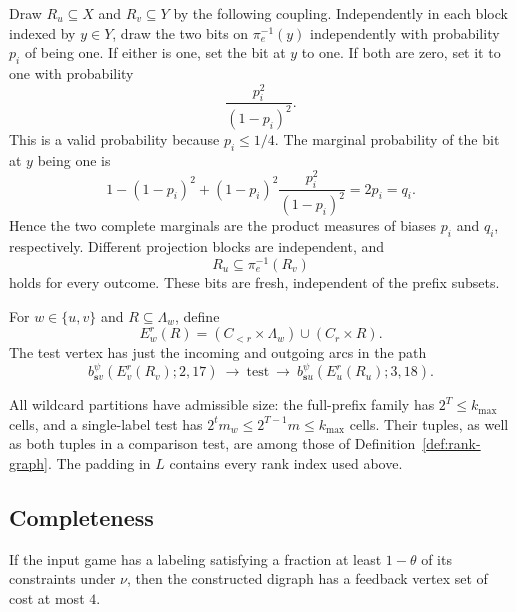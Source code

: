 \begin{definition}
\begin{enumerate}[label=\arabic*.,leftmargin=*]
  Draw $R_u\subseteq X$ and $R_v\subseteq Y$ by the following coupling.
  Independently in each block indexed by $y\in Y$, draw the two bits on
  $\pi_e^{-1}(y)$ independently with probability $p_i$ of being one.  If
  either is one, set the bit at $y$ to one.  If both are zero, set it to
  one with probability
  \begin{equation}
    \frac{p_i^2}{(1-p_i)^2}.
    \label{eq:coupling-residual}
  \end{equation}
  This is a valid probability because $p_i\le 1/4$.  The marginal
  probability of the bit at $y$ being one is
  \[
    1-(1-p_i)^2+(1-p_i)^2\frac{p_i^2}{(1-p_i)^2}
    =2p_i=q_i.
  \]
  Hence the two complete marginals are the product measures of biases
  $p_i$ and $q_i$, respectively.  Different projection blocks are
  independent, and
  \begin{equation}
    R_u\subseteq\pi_e^{-1}(R_v)
    \label{eq:coupling-inclusion}
  \end{equation}
  holds for every outcome.  These bits are fresh, independent of the
  prefix subsets.

  For $w\in\{u,v\}$ and $R\subseteq\Lambda_w$, define
  \begin{equation}
    E_w^r(R)=
      (C_{<r}\times\Lambda_w)\cup(C_r\times R).
    \label{eq:comparison-sets}
  \end{equation}
  The test vertex has just the incoming and outgoing arcs in the path
  \begin{equation}
    b_{\mathbf s v}^{\psi}(E_v^r(R_v);2,17)
    \ \longrightarrow\ \text{test}\ \longrightarrow\
    b_{\mathbf s u}^{\psi}(E_u^r(R_u);3,18).
    \label{eq:comparison-path}
  \end{equation}
\end{enumerate}
\end{definition}

All wildcard partitions have admissible size: the full-prefix family has
$2^T\le k_{\max}$ cells, and a single-label test has
$2^tm_w\le 2^{T-1}m\le k_{\max}$ cells.  Their tuples, as well as both
tuples in a comparison test, are among those of
Definition~\ref{def:rank-graph}.  The padding in $L$ contains every rank
index used above.

\subsection{Completeness}

\begin{proposition}
\label{prop:completeness}
If the input game has a labeling satisfying a fraction at least $1-\theta$
of its constraints under $\nu$, then the constructed digraph has a
feedback vertex set of cost at most $4$.
\end{proposition}

